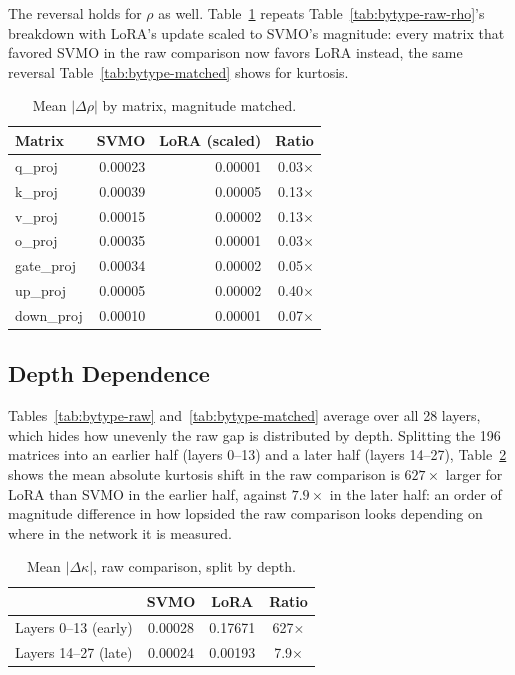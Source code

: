 \documentclass[conference]{IEEEtran}
\begin{document}
The reversal holds for $\rho$ as well. Table~\ref{tab:bytype-matched-rho} repeats Table~\ref{tab:bytype-raw-rho}'s breakdown with LoRA's update scaled to SVMO's magnitude: every matrix that favored SVMO in the raw comparison now favors LoRA instead, the same reversal Table~\ref{tab:bytype-matched} shows for kurtosis.

\begin{table}[t]
\centering
\caption{Mean $|\Delta\rho|$ by matrix, magnitude matched.}
\label{tab:bytype-matched-rho}
\begin{tabular}{@{}lrrr@{}}
\toprule
Matrix & SVMO & LoRA (scaled) & Ratio \\
\midrule
q\_proj & 0.00023 & 0.00001 & 0.03$\times$ \\
k\_proj & 0.00039 & 0.00005 & 0.13$\times$ \\
v\_proj & 0.00015 & 0.00002 & 0.13$\times$ \\
o\_proj & 0.00035 & 0.00001 & 0.03$\times$ \\
gate\_proj & 0.00034 & 0.00002 & 0.05$\times$ \\
up\_proj & 0.00005 & 0.00002 & 0.40$\times$ \\
down\_proj & 0.00010 & 0.00001 & 0.07$\times$ \\
\bottomrule
\end{tabular}
\end{table}

\subsection{Depth Dependence}
\label{sec:depth}

Tables~\ref{tab:bytype-raw} and~\ref{tab:bytype-matched} average over all 28 layers, which hides how unevenly the raw gap is distributed by depth. Splitting the 196 matrices into an earlier half (layers 0--13) and a later half (layers 14--27), Table~\ref{tab:depth} shows the mean absolute kurtosis shift in the raw comparison is $627\times$ larger for LoRA than SVMO in the earlier half, against $7.9\times$ in the later half: an order of magnitude difference in how lopsided the raw comparison looks depending on where in the network it is measured.

\begin{table}[t]
\centering
\caption{Mean $|\Delta\kappa|$, raw comparison, split by depth.}
\label{tab:depth}
\begin{tabular}{@{}lccc@{}}
\toprule
 & SVMO & LoRA & Ratio \\
\midrule
Layers 0--13 (early) & 0.00028 & 0.17671 & 627$\times$ \\
Layers 14--27 (late) & 0.00024 & 0.00193 & 7.9$\times$ \\
\bottomrule
\end{tabular}
\end{table}
\end{document}
